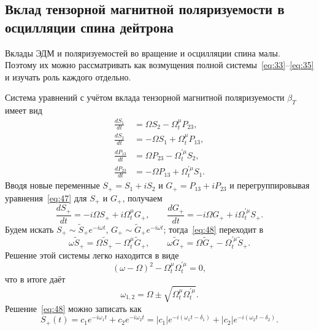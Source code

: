 \documentclass[11pt,a4paper]{article}
\begin{document}
\subsection{Вклад тензорной магнитной поляризуемости в осцилляции спина дейтрона}

Вклады ЭДМ и поляризуемостей во вращение и осцилляции спина малы.
Поэтому их можно рассматривать как возмущения полной системы~\eqref{eq:33}--\eqref{eq:35}
и изучать роль каждого отдельно.

Система уравнений с учётом вклада тензорной магнитной поляризуемости
$\beta_T$ имеет вид
\begin{equation}
\begin{aligned}
\frac{dS_1}{dt}&=\Omega S_2-\Omega_t^{\mu} P_{23},\\
\frac{dS_2}{dt}&=-\Omega S_1+\Omega_t^{\mu} P_{13},\\
\frac{dP_{13}}{dt}&=\Omega P_{23}-\Omega_t^{\prime\mu} S_2,\\
\frac{dP_{23}}{dt}&=-\Omega P_{13}+\Omega_t^{\prime\mu} S_1.
\end{aligned}
\label{eq:47}
\end{equation}
Вводя новые переменные $S_+=S_1+i S_2$ и $G_+=P_{13}+i P_{23}$
и перегруппировывая уравнения~\eqref{eq:47} для $S_+$ и $G_+$, получаем
\begin{equation}
\frac{dS_+}{dt}=-i\Omega S_++i\Omega_t^{\mu} G_+,\qquad
\frac{dG_+}{dt}=-i\Omega G_++i\Omega_t^{\prime\mu} S_+.
\label{eq:48}
\end{equation}
Будем искать $S_+\sim\tilde{S}_+ e^{-i\omega t}$,
$G_+\sim\tilde{G}_+ e^{-i\omega t}$; тогда~\eqref{eq:48} переходит в
\begin{equation}
\omega\tilde{S}_+=\Omega\tilde{S}_+-\Omega_t^{\mu}\tilde{G}_+,\qquad
\omega\tilde{G}_+=\Omega\tilde{G}_+-\Omega_t^{\prime\mu}\tilde{S}_+.
\label{eq:49}
\end{equation}
Решение этой системы легко находится в виде
\begin{equation}
(\omega-\Omega)^2-\Omega_t^{\mu}\Omega_t^{\prime\mu}=0,
\label{eq:50}
\end{equation}
что в итоге даёт
\begin{equation}
\omega_{1,2}=\Omega\pm\sqrt{\Omega_t^{\mu}\Omega_t^{\prime\mu}}.
\label{eq:51}
\end{equation}
Решение~\eqref{eq:48} можно записать как
\begin{equation}
S_+(t)=c_1 e^{-i\omega_1 t}+c_2 e^{-i\omega_2 t}
=|c_1|e^{-i(\omega_1 t-\delta_1)}+|c_2|e^{-i(\omega_2 t-\delta_2)}.
\label{eq:52}
\end{equation}
\end{document}
